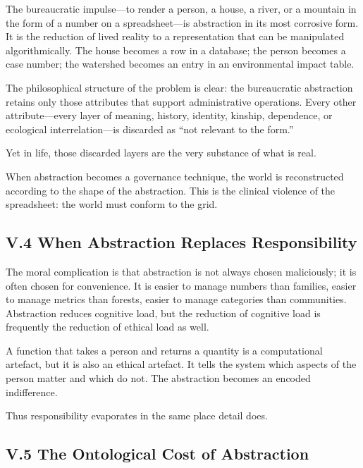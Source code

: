 \documentclass[11pt,letterpaper]{article}
\begin{document}
The bureaucratic impulse—to render a person, a house, a river, or a mountain in the form of a number on a spreadsheet—is abstraction in its most corrosive form. It is the reduction of lived reality to a representation that can be manipulated algorithmically. The house becomes a row in a database; the person becomes a case number; the watershed becomes an entry in an environmental impact table.

The philosophical structure of the problem is clear: the bureaucratic abstraction retains only those attributes that support administrative operations. Every other attribute—every layer of meaning, history, identity, kinship, dependence, or ecological interrelation—is discarded as ``not relevant to the form.''

Yet in life, those discarded layers are the very substance of what is real.

When abstraction becomes a governance technique, the world is reconstructed according to the shape of the abstraction. This is the clinical violence of the spreadsheet: the world must conform to the grid.

\subsection{V.4 When Abstraction Replaces Responsibility}

The moral complication is that abstraction is not always chosen maliciously; it is often chosen for convenience. It is easier to manage numbers than families, easier to manage metrics than forests, easier to manage categories than communities. Abstraction reduces cognitive load, but the reduction of cognitive load is frequently the reduction of ethical load as well.

A function that takes a person and returns a quantity is a computational artefact, but it is also an ethical artefact. It tells the system which aspects of the person matter and which do not. The abstraction becomes an encoded indifference.

Thus responsibility evaporates in the same place detail does.

\subsection{V.5 The Ontological Cost of Abstraction}
\end{document}
